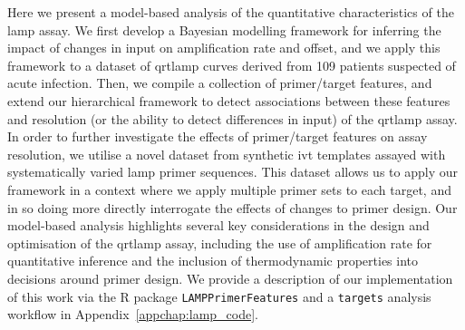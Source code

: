 \documentclass[../thesis.tex]{subfiles}
\begin{document}
Here we present a model-based analysis of the quantitative characteristics of the \gls{lamp} assay. We first develop a Bayesian modelling framework for inferring the impact of changes in  input on amplification rate and offset, and we apply this framework to a dataset of \gls{qrtlamp} curves derived from 109 patients suspected of acute infection. Then, we compile a collection of primer/target features, and extend our hierarchical framework to detect associations between these features and resolution (or the ability to detect differences in  input) of the \gls{qrtlamp} assay. In order to further investigate the effects of primer/target features on assay resolution, we utilise a novel dataset from synthetic \gls{ivt}  templates assayed with systematically varied \gls{lamp} primer sequences. This dataset allows us to apply our framework in a context where we apply multiple primer sets to each target, and in so doing more directly interrogate the effects of changes to primer design. Our model-based analysis highlights several key considerations in the design and optimisation of the \gls{qrtlamp} assay, including the use of amplification rate for quantitative inference and the inclusion of thermodynamic properties into decisions around primer design. We provide a description of our implementation of this work via the R package \texttt{LAMPPrimerFeatures} and a \texttt{targets} analysis workflow in Appendix~\ref{appchap:lamp_code}.

 

\enlargethispage{12pt}

\end{document}
